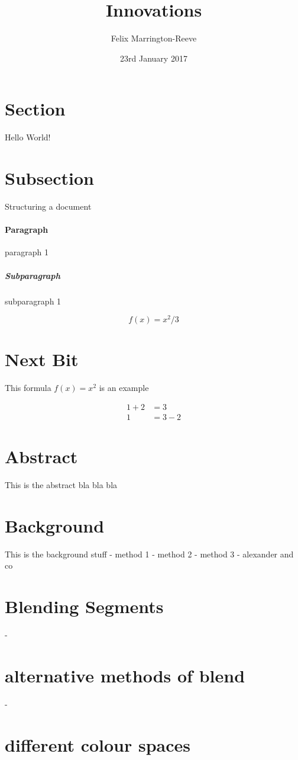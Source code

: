 \documentclass{article}
\title{Innovations}
\date{23rd January 2017}
\author{Felix Marrington-Reeve}
\begin{document}
	
	\maketitle

	\newpage

	\section{Section}
	Hello World!

	\section{Subsection}
	Structuring a document

	\paragraph{Paragraph}
	paragraph 1

	\subparagraph{Subparagraph}
	subparagraph 1

	\begin{equation*} %
		f(x) = x^2/3
	\end{equation*} %

	\section{Next Bit}
	This formula $f(x) = x^2$ is an example

	\begin{align*}
		1 + 2 &= 3 \\
		1 &= 3 - 2
	\end{align*}


	\newpage
	\section{Abstract}
	This is the abstract bla bla bla

	\section{Background}
	This is the background stuff
	- method 1
	- method 2
	- method 3
	- alexander and co

	\section{Blending Segments}
	- 
	\section{alternative methods of blend}
	-
	\section{different colour spaces}
\end{document}
